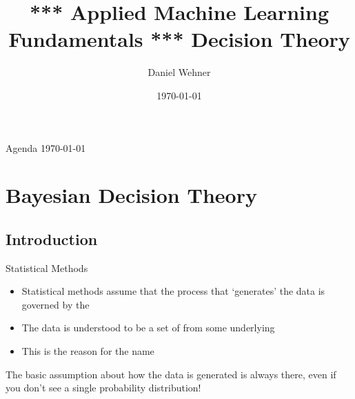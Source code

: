 


\title[Decision Theory]{*** Applied Machine Learning Fundamentals *** Decision Theory}
\author{Daniel Wehner}
\date{\today}




\maketitlepage


\begin{frame}{Agenda \today}
	\begin{multicols}{2}
		\tableofcontents
	\end{multicols}
\end{frame}


\section{Bayesian Decision Theory}

\subsection{Introduction}

\begin{frame}{Statistical Methods}{}
	\begin{itemize}
		\item Statistical methods assume that the process that `generates' the data is governed by the
		\item The data is understood to be a set of  from some
			underlying 
		\item This is the reason for the name 
	\end{itemize}
	\begin{boxBlueNoFrame}
		The basic assumption about how the data is generated is always there, even if you don't see
		a single probability distribution!
	\end{boxBlueNoFrame}
\end{frame}


